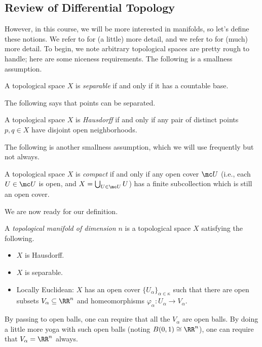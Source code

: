 \documentclass[../notes.tex]{subfiles}
\begin{document}
\subsection{Review of Differential Topology}
However, in this course, we will be more interested in manifolds, so let's define these notions. We refer to \cite{elber-diff-top} for (a little) more detail, and we refer to \cite{lee-manifolds} for (much) more detail. To begin, we note arbitrary topological spaces are pretty rough to handle; here are some niceness requirements. The following is a smallness assumption.
\begin{definition}[separable]
	A topological space $X$ is \textit{separable} if and only if it has a countable base.
\end{definition}
The following says that points can be separated.
\begin{definition}[Hausdorff]
	A topological space $X$ is \textit{Hausdorff} if and only if any pair of distinct points $p,q\in X$ have disjoint open neighborhoods.
\end{definition}
The following is another smallness assumption, which we will use frequently but not always.
\begin{definition}[compact]
	A topological space $X$ is \textit{compact} if and only if any open cover $\mc U$ (i.e., each $U\in\mc U$ is open, and $X=\bigcup_{U\in\mc U}U$) has a finite subcollection which is still an open cover.
\end{definition}
We are now ready for our definition.
\begin{definition}
	A \textit{topological manifold of dimension $n$} is a topological space $X$ satisfying the following.
	\begin{itemize}
		\item $X$ is Hausdorff.
		\item $X$ is separable.
		\item Locally Euclidean: $X$ has an open cover $\{U_\alpha\}_{\alpha\in\kappa}$ such that there are open subsets $V_\alpha\subseteq\RR^n$ and homeomorphisms $\varphi_\alpha\colon U_\alpha\to V_\alpha$.
	\end{itemize}
\end{definition}
\begin{remark}
	By passing to open balls, one can require that all the $V_\alpha$ are open balls. By doing a little more yoga with such open balls (noting $B(0,1)\cong\RR^n$), one can require that $V_\alpha=\RR^n$ always.
\end{remark}
\end{document}
